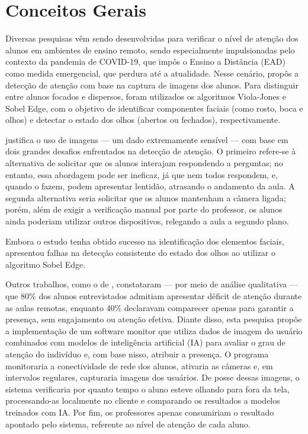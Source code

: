 \section{Conceitos Gerais}\label{sec:related}

Diversas pesquisas vêm sendo desenvolvidas para verificar o nível de atenção dos alunos em ambientes de ensino remoto, sendo especialmente impulsionadas pelo contexto da pandemia de COVID-19, que impôs o Ensino a Distância (EAD) como medida emergencial, que perdura até a atualidade. Nesse cenário, \cite{ong2021application} propôs a detecção de atenção com base na captura de imagens dos alunos. Para distinguir entre alunos focados e dispersos, foram utilizados os algoritmos Viola-Jones e Sobel Edge, com o objetivo de identificar componentes faciais (como rosto, boca e olhos) e detectar o estado dos olhos (abertos ou fechados), respectivamente.

\cite{ong2021application} justifica o uso de imagens — um dado extremamente sensível — com base em dois grandes desafios enfrentados na detecção de atenção. O primeiro refere-se à alternativa de solicitar que os alunos interajam respondendo a perguntas; no entanto, essa abordagem pode ser ineficaz, já que nem todos respondem, e, quando o fazem, podem apresentar lentidão, atrasando o andamento da aula. A segunda alternativa seria solicitar que os alunos mantenham a câmera ligada; porém, além de exigir a verificação manual por parte do professor, os alunos ainda poderiam utilizar outros dispositivos, relegando a aula a segundo plano.

Embora o estudo tenha obtido sucesso na identificação dos elementos faciais, apresentou falhas na detecção consistente do estado dos olhos ao utilizar o algoritmo Sobel Edge.

Outros trabalhos, como o de \cite{saha2021attendance}, constataram — por meio de análise qualitativa — que 80\% dos alunos entrevistados admitiam apresentar déficit de atenção durante as aulas remotas, enquanto 40\% declaravam comparecer apenas para garantir a presença, sem engajamento ou atenção efetiva. Diante disso, esta pesquisa propõe a implementação de um software monitor que utiliza dados de imagem do usuário combinados com modelos de inteligência artificial (IA) para avaliar o grau de atenção do indivíduo e, com base nisso, atribuir a presença. O programa monitoraria a conectividade de rede dos alunos, ativaria as câmeras e, em intervalos regulares, capturaria imagens dos usuários. De posse dessas imagens, o sistema verificaria por quanto tempo o aluno esteve olhando para fora da tela, processando-as localmente no cliente e comparando os resultados a modelos treinados com IA. Por fim, os professores apenas consumiriam o resultado apontado pelo sistema, referente ao nível de atenção de cada aluno.

